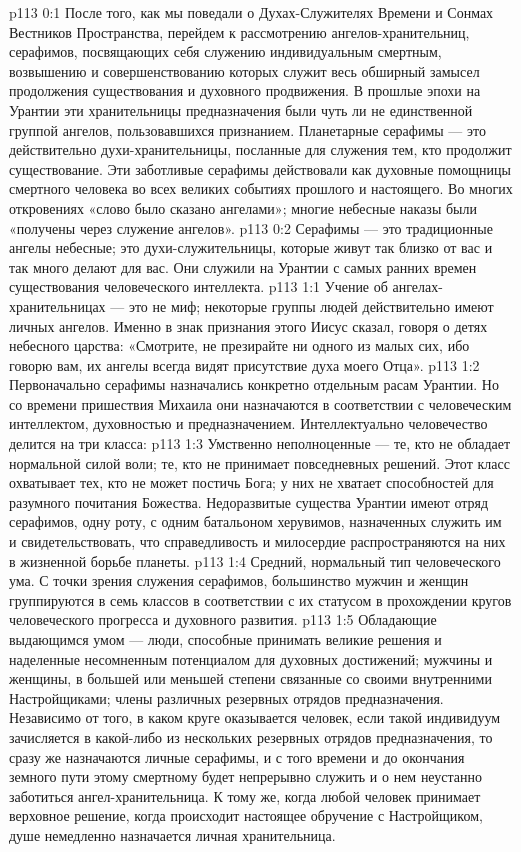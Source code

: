 \author{Глава Серафимов}
\vs p113 0:1 После того, как мы поведали о Духах\hyp{}Служителях Времени и Сонмах Вестников Пространства, перейдем к рассмотрению ангелов\hyp{}хранительниц, серафимов, посвящающих себя служению индивидуальным смертным, возвышению и совершенствованию которых служит весь обширный замысел продолжения существования и духовного продвижения. В прошлые эпохи на Урантии эти хранительницы предназначения были чуть ли не единственной группой ангелов, пользовавшихся признанием. Планетарные серафимы --- это действительно духи\hyp{}хранительницы, посланные для служения тем, кто продолжит существование. Эти заботливые серафимы действовали как духовные помощницы смертного человека во всех великих событиях прошлого и настоящего. Во многих откровениях «слово было сказано ангелами»; многие небесные наказы были «получены через служение ангелов».
\vs p113 0:2 Серафимы --- это традиционные ангелы небесные; это духи\hyp{}служительницы, которые живут так близко от вас и так много делают для вас. Они служили на Урантии с самых ранних времен существования человеческого интеллекта.
\vs p113 1:1 Учение об ангелах\hyp{}хранительницах --- это не миф; некоторые группы людей действительно имеют личных ангелов. Именно в знак признания этого Иисус сказал, говоря о детях небесного царства: «Смотрите, не презирайте ни одного из малых сих, ибо говорю вам, их ангелы всегда видят присутствие духа моего Отца».
\vs p113 1:2 Первоначально серафимы назначались конкретно отдельным расам Урантии. Но со времени пришествия Михаила они назначаются в соответствии с человеческим интеллектом, духовностью и предназначением. Интеллектуально человечество делится на три класса:
\vs p113 1:3 \bibnobreakspace Умственно неполноценные --- те, кто не обладает нормальной силой воли; те, кто не принимает повседневных решений. Этот класс охватывает тех, кто не может постичь Бога; у них не хватает способностей для разумного почитания Божества. Недоразвитые существа Урантии имеют отряд серафимов, одну роту, с одним батальоном херувимов, назначенных служить им и свидетельствовать, что справедливость и милосердие распространяются на них в жизненной борьбе планеты.
\vs p113 1:4 \bibnobreakspace Средний, нормальный тип человеческого ума. С точки зрения служения серафимов, большинство мужчин и женщин группируются в семь классов в соответствии с их статусом в прохождении кругов человеческого прогресса и духовного развития.
\vs p113 1:5 \bibnobreakspace Обладающие выдающимся умом --- люди, способные принимать великие решения и наделенные несомненным потенциалом для духовных достижений; мужчины и женщины, в большей или меньшей степени связанные со своими внутренними Настройщиками; члены различных резервных отрядов предназначения. Независимо от того, в каком круге оказывается человек, если такой индивидуум зачисляется в какой\hyp{}либо из нескольких резервных отрядов предназначения, то сразу же назначаются личные серафимы, и с того времени и до окончания земного пути этому смертному будет непрерывно служить и о нем неустанно заботиться ангел\hyp{}хранительница. К тому же, когда любой человек принимает  верховное решение, когда происходит настоящее обручение с Настройщиком, душе немедленно назначается личная хранительница.
